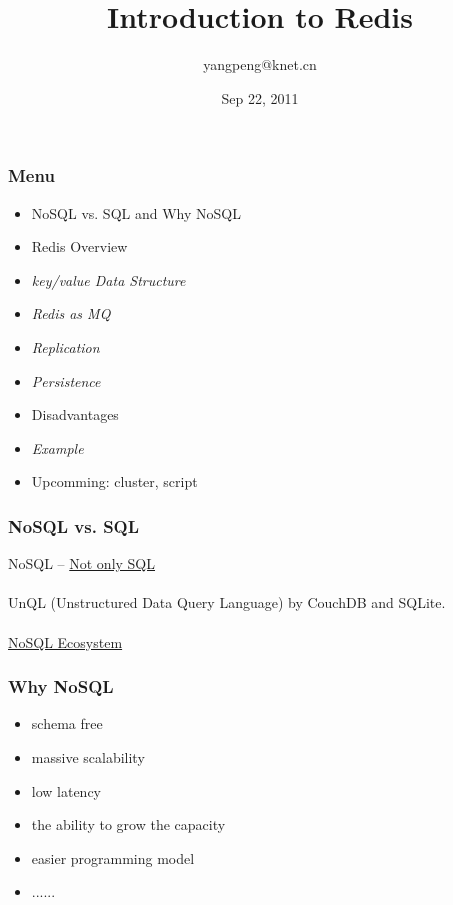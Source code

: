 \documentclass{beamer}
\title[Introduction to Redis]{Introduction to Redis}
\author{yangpeng@knet.cn}
\institute{\song 技术部}
\date{Sep 22, 2011}
\begin{document}
\begin{frame}
  \titlepage
\end{frame}



\begin{frame}
  \frametitle{Menu}
  \begin{itemize}

  \item NoSQL vs. SQL and Why NoSQL \\
  \item Redis Overview \\
  \item \emph{key/value Data Structure} \\
  \item \emph{Redis as MQ} \\
  \item \emph{Replication} \\
  \item \emph{Persistence} \\
  \item Disadvantages \\
  \item \emph{Example} \\
  \item Upcomming: cluster, script \\

  \end{itemize}
\end{frame}




\begin{frame}
  \frametitle{NoSQL vs. SQL}
  NoSQL -- \href{http://en.wikipedia.org/wiki/NoSQL}{Not only SQL} \\
  ~\\
  UnQL (Unstructured Data Query Language) by CouchDB and SQLite. \\
  ~\\
  \href{http://lgone.com/html/y2011/882.html}{NoSQL Ecosystem} \\
\end{frame}





\begin{frame}
  \frametitle{Why NoSQL}
  \begin{itemize}
  \item schema free \\
  \item massive scalability \\
  \item low latency \\
  \item the ability to grow the capacity \\
  \item easier programming model \\
  \item ...... \\
  \end{itemize}
\end{frame}
\end{document}

